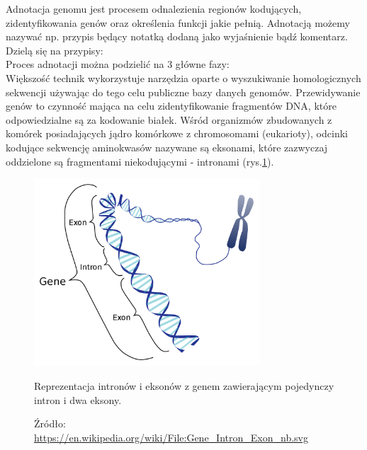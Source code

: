 Adnotacja genomu jest procesem odnalezienia regionów kodujących, zidentyfikowania genów oraz określenia funkcji jakie pełnią.
Adnotacją możemy nazywać np. przypis będący notatką dodaną jako wyjaśnienie bądź komentarz. Dzielą się na przypisy:
\\
Proces adnotacji można podzielić na 3 główne fazy:
\\

Większość technik wykorzystuje narzędzia oparte o wyszukiwanie homologicznych sekwencji używając do tego celu publiczne bazy danych genomów.
Przewidywanie genów to czynność mająca na celu zidentyfikowanie fragmentów DNA, które odpowiedzialne są za kodowanie białek.
Wśród organizmów zbudowanych z komórek posiadających jądro komórkowe z chromosomami (eukarioty), odcinki kodujące sekwencję aminokwasów nazywane są eksonami, które zazwyczaj oddzielone są fragmentami niekodującymi - intronami (rys.\ref{img:intron-exon}).

\begin{figure}[h]
	\centering
	\includegraphics[width=0.75\textwidth]{img/intron-exon.png}
	\caption{Reprezentacja intronów i eksonów z genem zawierającym pojedynczy intron i dwa eksony.}
	\vspace{-0.5cm}
	\caption*{\scriptsize Źródło: \url{https://en.wikipedia.org/wiki/File:Gene\_Intron\_Exon\_nb.svg}}
	\label{img:intron-exon}
\end{figure}


